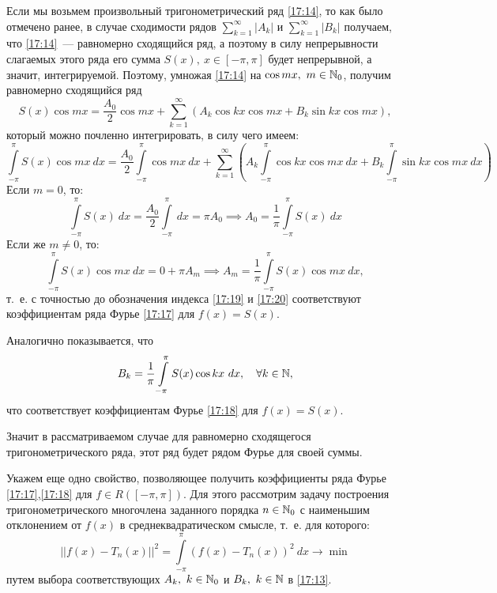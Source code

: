 \documentclass[../../main.tex]{subfiles}
\begin{document}
Если мы возьмем произвольный 
тригонометрический ряд \eqref{17:14}, то как было отмечено ранее, в случае 
сходимости рядов
$\sum\limits_{k=1}^{\infty} \left| A_k \right|$ и $\sum\limits_{k=1}^{\infty} 
\left| B_k \right|$ получаем, что
\eqref{17:14}~--- равномерно сходящийся ряд, а поэтому в силу непрерывности 
слагаемых этого ряда его сумма $S(x),\ x\in\left[ -\pi,\pi \right] $ будет 
непрерывной, а значит, интегрируемой.
Поэтому, умножая \eqref{17:14} на $\cos{mx},\ m \in \mathbb{N}_0$, получим равномерно 
сходящийся ряд
\[  S(x) \cos{mx} =  \frac{A_0}{2} \cos{mx} + \sum_{k=1}^{\infty}  \left( A_k 
\cos{kx} \cos{mx} + B_k \sin{kx} \cos{mx} \right), \]
который можно почленно интегрировать, в силу чего имеем:
\[  \int\limits_{-\pi}^{\pi} S(x) \cos{mx} \ dx = 
\frac{A_0}{2}\int\limits_{-\pi}^{\pi} \cos{mx} \ dx + \sum_{k=1}^{\infty}  
\left( A_k \int\limits_{-\pi}^{\pi} \cos{kx} \cos{mx} \ dx + B_k 
\int\limits_{-\pi}^{\pi} \sin{kx} \cos{mx} \ dx \right)  \]
Если $m=0$, то:
\begin{equation}
\label{17:19}
\int\limits_{-\pi}^{\pi} S(x) \ dx = \frac{A_0}{2}\int\limits_{-\pi}^{\pi} \ 
dx  = \pi A_0  \implies A_0 = \frac{1}{\pi} \int\limits_{-\pi}^{\pi} S(x) \ dx
\end{equation}
Если же $m \ne 0$, то:
\begin{equation}
\label{17:20}
\int\limits_{-\pi}^{\pi} S(x) \cos{mx} \ dx = 0 + \pi A_m \implies A_m = 
\frac{1}{\pi} \int\limits_{-\pi}^{\pi} S(x) \cos{mx} \ dx,
\end{equation}
т.~е. с точностью до обозначения индекса \eqref{17:19} и \eqref{17:20} 
соответствуют коэффициентам ряда Фурье \eqref{17:17} для $f(x) = S(x)$.

Аналогично показывается, что
\begin{equation}
\label{17:21}
B_k = \frac{1}{\pi} \int\limits_{-\pi}^{\pi} S(x) \cos{kx} \ dx, \quad 
\forall k \in \mathbb{N},
\end{equation}
что соответствует коэффициентам Фурье \eqref{17:18} для $f(x) = S(x)$. 

Значит в рассматриваемом случае для равномерно сходящегося тригонометрического 
ряда, этот ряд будет рядом Фурье для своей суммы.

Укажем еще одно свойство, позволяющее получить коэффициенты ряда Фурье 
\eqref{17:17},\eqref{17:18} для $f \in R\left( \left[ -\pi,\pi\right]  
\right).$ Для этого рассмотрим задачу построения тригонометрического 
многочлена заданного порядка $n \in \mathbb{N}_0$ с наименьшим отклонением от $f(x)$ в 
среднеквадратическом смысле, т.~е. для которого:
\begin{equation}
\label{17:22}
\left|| f(x) -T_n(x) |\right| ^2 = \int \limits_{-\pi}^{\pi} \left( f(x) - 
T_n(x)\right)^2 \ dx \to \min
\end{equation}
путем выбора соответствующих $A_k,\ k \in \mathbb{N}_0$ и $B_k,\ k \in \mathbb{N}$ в 
\eqref{17:13}.
\end{document}
